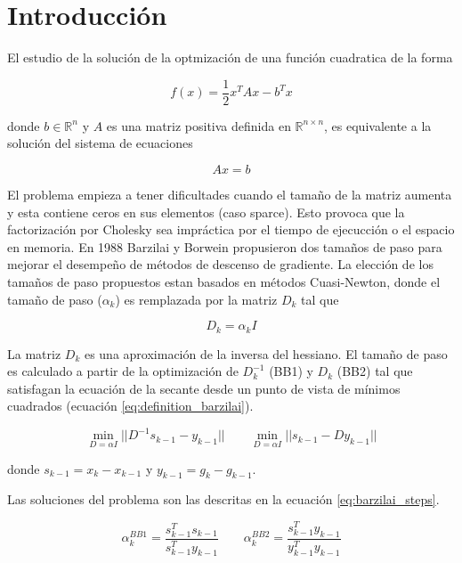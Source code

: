 \section*{Introducción}

El estudio de la solución de la optmización de una función cuadratica de la forma

\begin{equation}
    f(x) = \frac{1}{2}x^TAx- b^Tx \label{eq:quadratic_function}
\end{equation}

donde $b\in\mathbb{R}^n$ y $A$ es una matriz positiva definida en $\mathbb{R}^{n\times n}$, es equivalente a la solución del sistema de ecuaciones

\begin{equation*}
    Ax=b
\end{equation*}

El problema empieza a tener dificultades cuando el tamaño de la matriz aumenta y esta contiene ceros en sus elementos (caso sparce). Esto provoca que la factorización por Cholesky sea impráctica por el tiempo de ejecucción o el espacio en memoria.  En 1988 Barzilai y Borwein\cite{barzilai_1988} propusieron dos tamaños de paso para mejorar el desempeño de métodos de descenso de gradiente. La elección de los tamaños de paso propuestos estan basados en métodos Cuasi-Newton, donde el tamaño de paso ($\alpha_k$) es remplazada por la matriz $D_k$ tal que

\begin{equation}
    D_k = \alpha_k \mathit{I}
\end{equation}

La matriz $D_k$ es una aproximación de la inversa del hessiano. El tamaño de paso es calculado a partir de la optimización de $D_k^{-1}$  (BB1) y  $D_k$ (BB2) tal que satisfagan la ecuación de la secante desde un punto de vista de mínimos cuadrados (ecuación \ref{eq:definition_barzilai}).

\begin{equation}
    \min_{D=\alpha \mathit{I}} ||D^{-1}s_{k-1}-y_{k-1}|| \qquad \min_{D=\alpha \mathit{I}} ||s_{k-1}-Dy_{k-1}|| \label{eq:definition_barzilai}
\end{equation}

donde $s_{k-1} = x_k - x_{k-1}$ y $y_{k-1} = g_k - g_{k-1}$.

Las soluciones del problema son las descritas en la ecuación \ref{eq:barzilai_steps}.

\begin{equation}
    \alpha^{BB1}_k = \frac{s^T_{k-1}s_{k-1}}{s^T_{k-1}y_{k-1}} \qquad \alpha_k^{BB2} = \frac{s_{k-1}^Ty_{k-1}}{y_{k-1}^Ty_{k-1}} \label{eq:barzilai_steps}
\end{equation}

